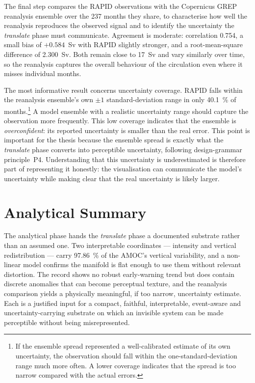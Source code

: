 The final step compares the RAPID observations with the Copernicus GREP reanalysis ensemble over the 237 months they share, to characterise how well the reanalysis reproduces the observed signal and to identify the uncertainty the \emph{translate} phase must communicate. Agreement is moderate: correlation 0.754, a small bias of $+0.584$~Sv with RAPID slightly stronger, and a root-mean-square difference of 2.300~Sv. Both remain close to 17~Sv and vary similarly over time, so the reanalysis captures the overall behaviour of the circulation even where it misses individual months.

The most informative result concerns uncertainty coverage. RAPID falls within the reanalysis ensemble's own $\pm1$ standard-deviation range in only \SI{40.1}{\percent} of months.\footnote{If the ensemble spread represented a well-calibrated estimate of its own uncertainty, the observation should fall within the one-standard-deviation range much more often. A lower coverage indicates that the spread is too narrow compared with the actual errors.} A model ensemble with a realistic uncertainty range should capture the observation more frequently. This low coverage indicates that the ensemble is \emph{overconfident}: its reported uncertainty is smaller than the real error. This point is important for the thesis because the ensemble spread is exactly what the \emph{translate} phase converts into perceptible uncertainty, following design-grammar principle~P4. Understanding that this uncertainty is underestimated is therefore part of representing it honestly: the visualisation can communicate the model's uncertainty while making clear that the real uncertainty is likely larger.

\section{Analytical Summary}
\label{sec:detect-summary}

The analytical phase hands the \emph{translate} phase a documented substrate rather than an assumed one. Two interpretable coordinates --- intensity and vertical redistribution --- carry \SI{97.86}{\percent} of the AMOC's vertical variability, and a non-linear model confirms the manifold is flat enough to use them without relevant distortion. The record shows no robust early-warning trend but does contain discrete anomalies that can become perceptual texture, and the reanalysis comparison yields a physically meaningful, if too narrow, uncertainty estimate. Each is a justified input for a compact, faithful, interpretable, event-aware and uncertainty-carrying substrate on which an invisible system can be made perceptible without being misrepresented.